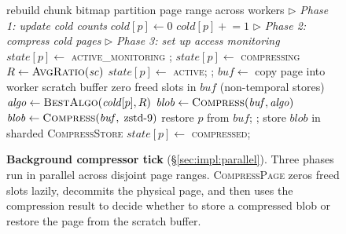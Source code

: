 \begin{figure}[t]
\begin{algorithmic}[1]
  \State rebuild chunk bitmap
  \State partition page range across workers
  \State $\triangleright$ \textit{Phase 1: update cold counts}
      \State $\mathit{cold}[p] \gets 0$
    \Else
      \State $\mathit{cold}[p] \mathrel{+}= 1$
    \EndIf
  \EndFor
  \State $\triangleright$ \textit{Phase 2: compress cold pages}
    \State {}
  \EndFor
  \State $\triangleright$ \textit{Phase 3: set up access monitoring}
    \State {}
    \State $\mathit{state}[p] \gets$ \textsc{active\_monitoring}
  \EndFor
\EndFunction
\Statex
{}
  \State {};\; $\mathit{state}[p] \gets$ \textsc{compressing}
  \State $R \gets \Call{AvgRatio}{\mathit{sc}}$
    \State $\mathit{state}[p] \gets$ \textsc{active};\; ;\; \Return
  \EndIf
  \State {}
  \State $\mathit{buf} \gets$ copy page into worker scratch buffer
  \State zero freed slots in $\mathit{buf}$ (non-temporal stores)
  \State {}
  \State {}
  \State $\mathit{algo} \gets \Call{BestAlgo}{\mathit{cold}[p], R}$
  \State $\mathit{blob} \gets \Call{Compress}{\mathit{buf}, \mathit{algo}}$
      \State $\mathit{blob} \gets \Call{Compress}{\mathit{buf},\;\text{zstd-9}}$
    \EndIf
      \State restore $p$ from $\mathit{buf}$;\; ;\; \Return
    \EndIf
  \EndIf
  \State store $\mathit{blob}$ in sharded \textsc{CompressStore}
  \State $\mathit{state}[p] \gets$ \textsc{compressed};\; 
\EndFunction
\end{algorithmic}
\caption{\textbf{Background compressor tick}
  (\S\ref{sec:impl:parallel}).  Three phases run in parallel
  across disjoint page ranges.  \textsc{CompressPage} zeros freed
  slots lazily, decommits the physical page, and then uses the
  compression result to decide whether to store a compressed blob
  or restore the page from the scratch buffer.}
\label{fig:algo:compress}
\end{figure}

